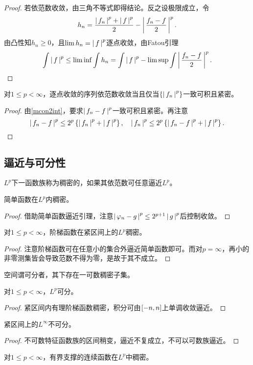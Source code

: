 \documentclass{ctexrep}
\begin{document}
  \begin{proof}
    若依范数收敛，由三角不等式即得结论。反之设极限成立，令
    \[ h_n = \frac{\left|\, f_n \,\right|^p+\left|\, f \,\right|^p}{2}-\left|\, \frac{f_n-f}{2} \,\right|^p. \]
    由凸性知$h_n\ge 0$，且$\lim h_n = \left|\, f \,\right|^p$逐点收敛，由Fatou引理
    \[ \int \left|\, f \,\right|^p \le \lim \inf \int h_n = \int \left|\, f \,\right|^p - \lim\sup\int\left|\, \frac{f_n-f}{2} \,\right|^p. \qedhere \]
  \end{proof}
  \begin{theorem}
    对$1\le p<\infty$，逐点收敛的序列依范数收敛当且仅当$\left\{\left|\, f_n \,\right|^p\right\}$一致可积且紧密。
  \end{theorem}
  \begin{proof}
    由\cref{mcon2int}，要求$\left|\, f_n-f \,\right|^p$一致可积且紧密。再注意
    \[ \left|\, f_n-f \,\right|^p \le 2^p\left\{\left|\, f_n \,\right|^p+\left|\, f \,\right|^p\right\}, \quad \left|\, f_n \,\right|^p \le 2^p\left\{\left|\, f_n-f \,\right|^p+\left|\, f \,\right|^p\right\}. \qedhere \]
  \end{proof}
  \subsection{逼近与可分性}
  \begin{definition}
    $L^p$下一函数族称为稠密的，如果其依范数可任意逼近$L^p$。
  \end{definition}
  \begin{proposition}
    简单函数在$L^p$内稠密。
  \end{proposition}
  \begin{proof}
    借助简单函数逼近引理，注意$\left|\, \varphi_n-g \,\right|^p \le 2^{p+1}\left|\, g \,\right|^p$后控制收敛。
  \end{proof}
  \begin{proposition}
    对$1\le p<\infty$，阶梯函数在紧区间上的$L^p$稠密。
  \end{proposition}
  \begin{proof}
    注意阶梯函数可在任意小的集合外逼近简单函数即可。而对$p=\infty$，再小的非零测集皆会导致范数不得为零，是故于其不成立。
  \end{proof}
  \begin{definition}
    空间谓可分者，其下存在一可数稠密子集。
  \end{definition}
  \begin{theorem}
  \label{thm:lpsep}
    对$1\le p < \infty$，$L^p$可分。
  \end{theorem}
  \begin{proof}
    紧区间内有理阶梯函数稠密，积分可由$\left[-n,n\right]$上单调收敛逼近。
  \end{proof}
  \begin{ex}
    紧区间上的$L^\infty$不可分。
  \end{ex}
  \begin{proof}
    不可数特征函数族的区间稍变，逼近不复成立，不可以可数族逼近。
  \end{proof}
  \begin{theorem}
    对$1\le p<\infty$，有界支撑的连续函数在$L^p$中稠密。
  \end{theorem}
\end{document}
